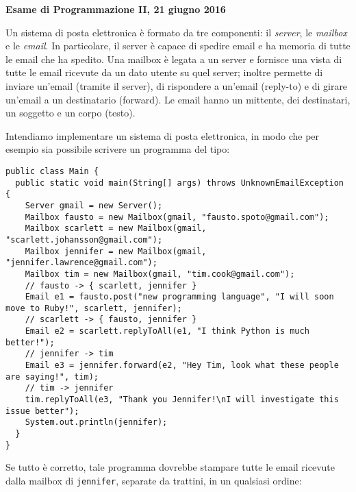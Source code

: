 \documentclass{article}[10pt]
\begin{document}
\begin{center} {\bf Esame di Programmazione II, 21 giugno 2016}\end{center}

Un sistema di posta elettronica \`e formato da tre componenti:
il \emph{server}, le \emph{mailbox} e le \emph{email}.
In particolare, il server \`e capace di spedire email e ha memoria di
tutte le email che ha spedito. Una mailbox \`e legata a un server
e fornisce una vista di tutte le email ricevute da un dato utente
su quel server;
inoltre permette di inviare un'email (tramite il server), di rispondere a un'email
(reply-to) e di girare un'email a un destinatario (forward). Le email hanno un mittente,
dei destinatari, un soggetto e un corpo (testo).

Intendiamo implementare un sistema di posta elettronica, in modo che per esempio
sia possibile scrivere un programma del tipo:

{\small\begin{verbatim}
public class Main {
  public static void main(String[] args) throws UnknownEmailException {
    Server gmail = new Server();
    Mailbox fausto = new Mailbox(gmail, "fausto.spoto@gmail.com");
    Mailbox scarlett = new Mailbox(gmail, "scarlett.johansson@gmail.com");
    Mailbox jennifer = new Mailbox(gmail, "jennifer.lawrence@gmail.com");
    Mailbox tim = new Mailbox(gmail, "tim.cook@gmail.com");
    // fausto -> { scarlett, jennifer }
    Email e1 = fausto.post("new programming language", "I will soon move to Ruby!", scarlett, jennifer);
    // scarlett -> { fausto, jennifer }
    Email e2 = scarlett.replyToAll(e1, "I think Python is much better!");
    // jennifer -> tim
    Email e3 = jennifer.forward(e2, "Hey Tim, look what these people are saying!", tim);
    // tim -> jennifer
    tim.replyToAll(e3, "Thank you Jennifer!\nI will investigate this issue better");
    System.out.println(jennifer);
  }
}
\end{verbatim}}

\noindent
Se tutto \`e corretto, tale programma dovrebbe stampare tutte le email ricevute
dalla mailbox di \texttt{jennifer}, separate da trattini, in un qualsiasi ordine:
\end{document}
